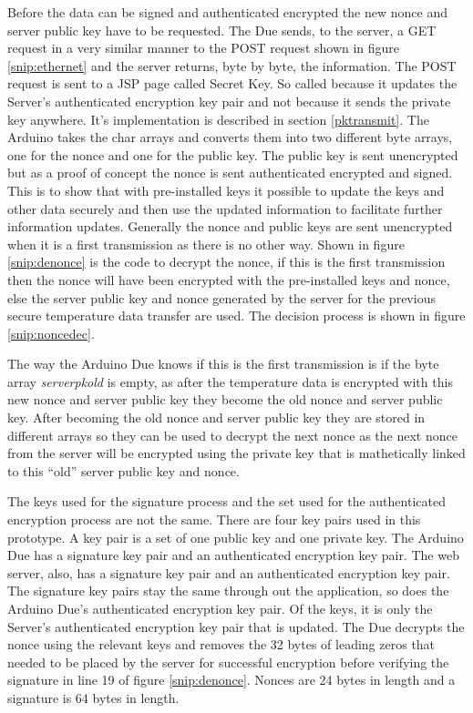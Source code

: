 Before the data can be signed and authenticated encrypted the new nonce and server public key have to be requested. The Due sends, to the server, a GET request in a very similar manner to the POST request shown in figure \ref{snip:ethernet} and the server returns, byte by byte, the information. The POST request is sent to a JSP page called Secret Key. So called because it updates the Server's authenticated encryption key pair and not because it sends the private key anywhere. It's implementation is described in section \ref{pktransmit}. The Arduino takes the char arrays and converts them into two different byte arrays, one for the nonce and one for the public key. The public key is sent unencrypted but as a proof of concept the nonce is sent authenticated encrypted and signed. This is to show that with pre-installed keys it possible to update the keys and other data securely and then use the updated information to facilitate further information updates. Generally the nonce and public keys are sent unencrypted when it is a first transmission as there is no other way. Shown in figure \ref{snip:denonce} is the code to decrypt the nonce, if this is the first transmission then the nonce will have been encrypted with the pre-installed keys and nonce, else the server public key and nonce generated by the server for the previous secure temperature data transfer are used. The decision process is shown in figure \ref{snip:noncedec}. 

The way the Arduino Due knows if this is the first transmission is if the byte array \emph{serverpkold} is empty, as after the temperature data is encrypted with this new nonce and server public key they become the old nonce and server public key. After becoming the old nonce and server public key they are stored in different arrays so they can be used to decrypt the next nonce as the next nonce from the server will be encrypted using the private key that is mathetically linked to this ``old'' server public key and nonce.

  The keys used for the signature process and the set used for the authenticated encryption process are not the same. There are four key pairs used in this prototype. A key pair is a set of one public key and one private key. The Arduino Due has a signature key pair and an authenticated encryption key pair. The web server, also, has a signature key pair and an authenticated encryption key pair. The signature key pairs stay the same through out the application, so does the Arduino Due's authenticated encryption key pair. Of the keys, it is only the Server's authenticated encryption key pair that is updated.
The Due decrypts the nonce using the relevant keys and removes the 32 bytes of leading zeros that needed to be placed by the server for successful encryption before verifying the signature in line 19 of figure \ref{snip:denonce}. Nonces are 24 bytes in length and a signature is 64 bytes in length.


